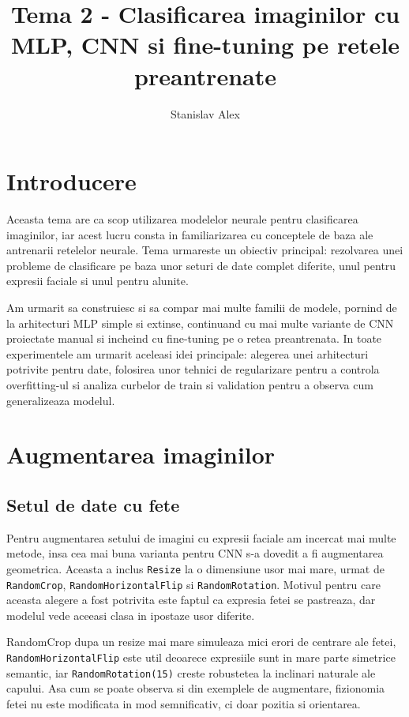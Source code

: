 \documentclass[12pt,a4paper]{article}
\title{Tema 2 - Clasificarea imaginilor cu MLP, CNN si fine-tuning pe retele preantrenate}
\author{Stanislav Alex}
\date{}
\begin{document}
\maketitle
\tableofcontents
\newpage

\section{Introducere}

Aceasta tema are ca scop utilizarea modelelor neurale pentru clasificarea imaginilor, iar acest lucru consta in familiarizarea cu conceptele de baza ale antrenarii retelelor neurale. Tema urmareste un obiectiv principal: rezolvarea unei probleme de clasificare pe baza unor seturi de date complet diferite, unul pentru expresii faciale si unul pentru alunite.

Am urmarit sa construiesc si sa compar mai multe familii de modele, pornind de la arhitecturi MLP simple si extinse, continuand cu mai multe variante de CNN proiectate manual si incheind cu fine-tuning pe o retea preantrenata. In toate experimentele am urmarit aceleasi idei principale: alegerea unei arhitecturi potrivite pentru date, folosirea unor tehnici de regularizare pentru a controla overfitting-ul si analiza curbelor de train si validation pentru a observa cum generalizeaza modelul.

\section{Augmentarea imaginilor}

\subsection{Setul de date cu fete}

Pentru augmentarea setului de imagini cu expresii faciale am incercat mai multe metode, insa cea mai buna varianta pentru CNN s-a dovedit a fi augmentarea geometrica. Aceasta a inclus \texttt{Resize} la o dimensiune usor mai mare, urmat de \texttt{RandomCrop}, \texttt{RandomHorizontalFlip} si \texttt{RandomRotation}. Motivul pentru care aceasta alegere a fost potrivita este faptul ca expresia fetei se pastreaza, dar modelul vede aceeasi clasa in ipostaze usor diferite.

RandomCrop dupa un resize mai mare simuleaza mici erori de centrare ale fetei, \texttt{RandomHorizontalFlip} este util deoarece expresiile sunt in mare parte simetrice semantic, iar \texttt{RandomRotation(15)} creste robustetea la inclinari naturale ale capului. Asa cum se poate observa si din exemplele de augmentare, fizionomia fetei nu este modificata in mod semnificativ, ci doar pozitia si orientarea.
\end{document}
